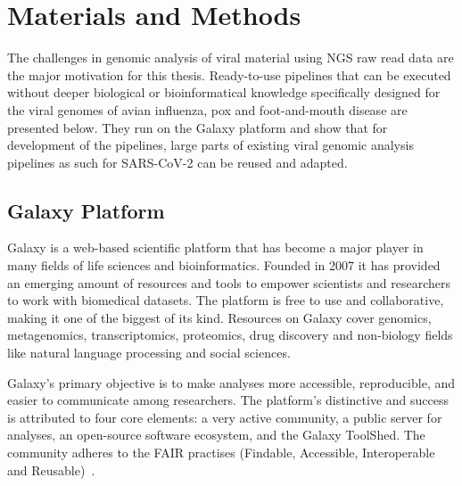 \chapter{Materials and Methods}\label{chap:methods}
The challenges in genomic analysis of viral material using NGS raw read data are the major motivation for this thesis. Ready-to-use pipelines that can be executed without deeper biological or bioinformatical knowledge specifically designed for the viral genomes of avian influenza, pox and foot-and-mouth disease are presented below. They run on the Galaxy platform and show that for development of the pipelines, large parts of existing viral genomic analysis pipelines as such for SARS-CoV-2 can be reused and adapted.

\section{Galaxy Platform}\label{sec:galaxy}
Galaxy is a web-based scientific platform that has become a major player in many fields of life sciences and bioinformatics. Founded in 2007 it has provided an emerging amount of resources and tools to empower scientists and researchers to work with biomedical datasets. The platform is free to use and collaborative, making it one of the biggest of its kind. Resources on Galaxy cover genomics, metagenomics, transcriptomics, proteomics, drug discovery and non-biology fields like natural language processing and social sciences.

Galaxy's primary objective is to make analyses more accessible, reproducible, and easier to communicate among researchers. The platform's distinctive and success is attributed to four core elements: a very active community, a public server for analyses, an open-source software ecosystem, and the Galaxy ToolShed. The community adheres to the FAIR practises (Findable, Accessible, Interoperable and Reusable)~\cite{10.1093/nar/gkac247}.

